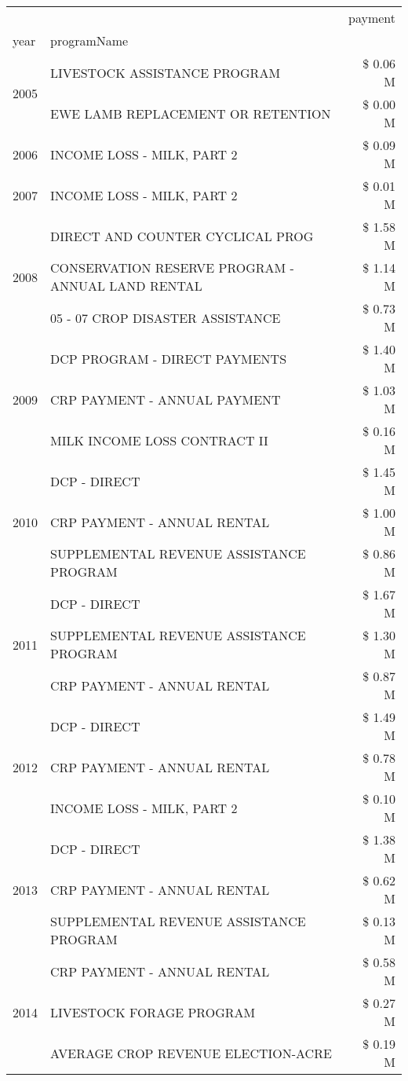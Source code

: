 \begin{tabular}{llr}
\toprule
 &  & payment \\
year & programName &  \\
\midrule
\multirow[t]{2}{*}{2005} & LIVESTOCK ASSISTANCE PROGRAM & \$ 0.06 M \\
 & EWE LAMB REPLACEMENT OR RETENTION & \$ 0.00 M \\
\cline{1-3}
2006 & INCOME LOSS - MILK, PART 2 & \$ 0.09 M \\
\cline{1-3}
2007 & INCOME LOSS - MILK, PART 2 & \$ 0.01 M \\
\cline{1-3}
\multirow[t]{3}{*}{2008} & DIRECT AND COUNTER CYCLICAL PROG & \$ 1.58 M \\
 & CONSERVATION RESERVE PROGRAM - ANNUAL LAND RENTAL & \$ 1.14 M \\
 & 05 - 07 CROP DISASTER ASSISTANCE & \$ 0.73 M \\
\cline{1-3}
\multirow[t]{3}{*}{2009} & DCP PROGRAM - DIRECT PAYMENTS & \$ 1.40 M \\
 & CRP PAYMENT - ANNUAL PAYMENT & \$ 1.03 M \\
 & MILK INCOME LOSS CONTRACT II & \$ 0.16 M \\
\cline{1-3}
\multirow[t]{3}{*}{2010} & DCP - DIRECT & \$ 1.45 M \\
 & CRP PAYMENT - ANNUAL RENTAL & \$ 1.00 M \\
 & SUPPLEMENTAL REVENUE ASSISTANCE PROGRAM & \$ 0.86 M \\
\cline{1-3}
\multirow[t]{3}{*}{2011} & DCP - DIRECT & \$ 1.67 M \\
 & SUPPLEMENTAL REVENUE ASSISTANCE PROGRAM & \$ 1.30 M \\
 & CRP PAYMENT - ANNUAL RENTAL & \$ 0.87 M \\
\cline{1-3}
\multirow[t]{3}{*}{2012} & DCP - DIRECT & \$ 1.49 M \\
 & CRP PAYMENT - ANNUAL RENTAL & \$ 0.78 M \\
 & INCOME LOSS - MILK, PART 2 & \$ 0.10 M \\
\cline{1-3}
\multirow[t]{3}{*}{2013} & DCP - DIRECT & \$ 1.38 M \\
 & CRP PAYMENT - ANNUAL RENTAL & \$ 0.62 M \\
 & SUPPLEMENTAL REVENUE ASSISTANCE PROGRAM & \$ 0.13 M \\
\cline{1-3}
\multirow[t]{3}{*}{2014} & CRP PAYMENT - ANNUAL RENTAL & \$ 0.58 M \\
 & LIVESTOCK FORAGE PROGRAM & \$ 0.27 M \\
 & AVERAGE CROP REVENUE ELECTION-ACRE & \$ 0.19 M \\

\end{tabular}
